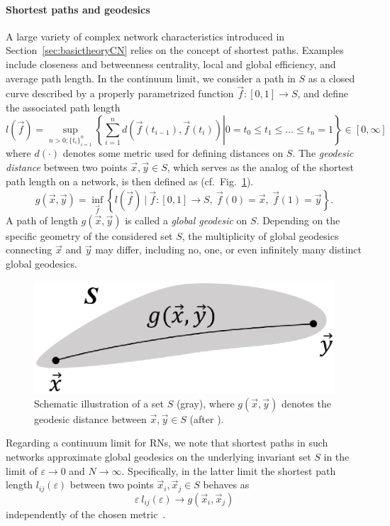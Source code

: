 		\paragraph{Shortest paths and geodesics}
		A large variety of complex network characteristics introduced in Section~\ref{sec:basictheoryCN} relies on the concept of shortest paths. Examples include closeness and betweenness centrality, local and global efficiency, and average path length. In the continuum limit, we consider a path in $S$ as a closed curve described by a properly parametrized function $\vec{f}:[0,1]\to S$, and define the associated path length
\begin{equation}
l(\vec{f}) = \sup_{n>0; \{t_i\}_{i=1}^n} \left.\left\{ \sum_{i=1}^n d(\vec{f}(t_{i-1}),\vec{f}(t_i)) \right| 0=t_0\leq t_1\leq\dots\leq t_n=1 \right\} \in[0,\infty]
\end{equation}
\noindent
where $d(\cdot)$ denotes some metric used for defining distances on $S$. The \textit{geodesic distance} between two points $\vec{x},\vec{y}\in S$, which serves as the analog of the shortest path length on a network, is then defined as (cf.~Fig.~\ref{fig:manifold}).
\begin{equation}
g(\vec{x},\vec{y}) = \inf_{\vec{f}} \left\{ l(\vec{f})\ |\ \vec{f}:[0,1]\to S,\ \vec{f}(0)=\vec{x},\ \vec{f}(1)=\vec{y} \right\}.
\end{equation}
\noindent
A path of length $g(\vec{x},\vec{y})$ is called a \emph{global geodesic} on $S$. Depending on the specific geometry of the considered set $S$, the multiplicity of global geodesics connecting $\vec{x}$ and $\vec{y}$ may differ, including no, one, or even infinitely many distinct global geodesics.
\begin{figure}
\centering
\includegraphics[width=.50\columnwidth]{Chapter03_RecurrenceNt/fig1.eps}
\caption{Schematic illustration of a set $S$ (gray), where $g(\vec{x},\vec{y})$ denotes the geodesic distance between $\vec{x},\vec{y}\in S$ (after \cite{Donges2012}).}
\label{fig:manifold}
\end{figure}


		Regarding a continuum limit for RNs, we note that shortest paths in such networks approximate global geodesics on the underlying invariant set $S$ in the limit of $\varepsilon\to 0$ and $N\to\infty$. Specifically, in the latter limit the shortest path length $l_{ij}(\varepsilon)$ between two points $\vec{x}_i, \vec{x}_j\in S$ behaves as
\begin{equation}
\varepsilon\ l_{ij}(\varepsilon) \to g(\vec{x}_i,\vec{x}_j)
\end{equation}
\noindent
independently of the chosen metric~\cite{Donges2012}.

